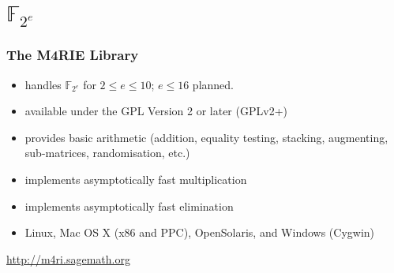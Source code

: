 \documentclass[11pt]{beamer}
\newcommand{\field}[1]{\mathbb{#1}}
\newcommand{\F}{\ensuremath{\field{F}}\xspace}
\begin{document}
\section{\texorpdfstring{$\F_{2^e}$}{F2E}}

\begin{frame}
\frametitle{The M4RIE Library}
\begin{itemize}
\item handles $\mathbb{F}_{2^e}$ for $2 \leq e \leq 10$; $e \leq 16$ planned.
\item available under the GPL Version 2 or later (GPLv2+)
\item provides basic arithmetic (addition, equality testing, stacking, augmenting, sub-matrices, randomisation, etc.)
\item implements asymptotically fast multiplication
\item implements asymptotically fast elimination
\item Linux, Mac OS X (x86 and PPC), OpenSolaris, and Windows (Cygwin)
\end{itemize}

\begin{block}{}
\centering
\url{http://m4ri.sagemath.org} 
\end{block}
\end{frame}
\end{document}
